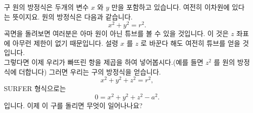 \begin{surferPage}{구}
원의 방정식은 두개의 변수 $x$ 와 $y$ 만을 포함하고 있습니다. 여전히 이차원에 있다는 뜻이지요.
원의 방정식은 다음과 같습니다.
\[x^2+y^2=r^2.\]
곡면을 돌려보면 여러분은 아마 원이 아닌 튜브를 볼 수 있을 것입니다. 이 것은 $z$ 좌표에 아무런 제한이 없기 때문입니다. 설령 $x$ 를 $z$ 로 바꾼다 해도 여전히 튜브를 얻을 것입니다.\\
그렇다면 이제 우리가 빠뜨린 항을 제곱을 하여 넣어봅시다.(예를 들면 $z^2$ 를 원의 방정식에 더합니다) 
그러면 우리는 구의 방정식을 얻습니다.
\[x^2+y^2+z^2=r^2,\]
SURFER 형식으로는
\[0=x^2+y^2+z^2-a^2.\]
입니다. 이제 이 구를 돌리면 무엇이 일어나나요?
\end{surferPage}
